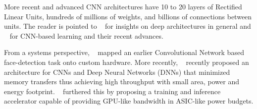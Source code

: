More recent and advanced CNN architectures have 10 to 20 layers of Rectified Linear Units, hundreds of millions of weights, and billions of connections between units.
The reader is pointed to ~\cite{Bengio2009} for insights on deep architectures in general and ~\cite{DNNNature2015} for CNN-based learning and their recent advances. 

From a systems perspective, ~\cite{Farabet2009} mapped an earlier Convolutional Network based face-detection task onto custom hardware. More recently, ~\cite{Chen2014} recently proposed an architecture for CNNs and Deep 
Neural Networks (DNNs) that minimized memory transfers thus achieving high
throughput with small area, power and energy footprint. ~\cite{DaDianNao} furthered this by proposing a training and inference accelerator 
capable of providing GPU-like bandwidth in ASIC-like power budgets.
